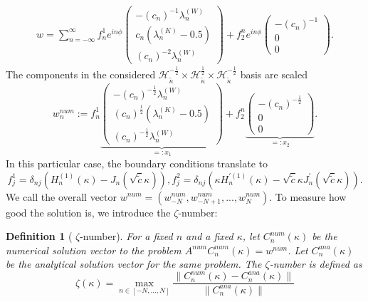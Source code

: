 \documentclass[12pt,journal,compsoc, onecolumn]{IEEEtran}
\newtheorem{definition}[theorem]{Definition}
\begin{document}
\begin{align}
w = \sum\limits_{n=-\infty}^\infty f^1_n e^{in\phi} 
\begin{pmatrix}
- (c_n)^{-1}\lambda_n^{(W)} \\
c_n(\lambda_n^{(K)} - 0.5)  \\
(c_n)^{-2}\lambda_n^{(W)} 
\end{pmatrix}
+ f_2^n e^{in\phi} 
\begin{pmatrix}
    -(c_n)^{-1} \\
    0 \\
    0
\end{pmatrix}.
\end{align}
The components in the considered $\mathcal{H}_{\tilde \kappa}^{-\frac{1}{2}} \times \mathcal{H}_{\tilde \kappa}^{\frac{1}{2}} \times \mathcal{H}_{\tilde \kappa}^{-\frac{1}{2}}$ basis are scaled  
$$
w^{num}_n
:=  f^1_n 
\underbrace{
\begin{pmatrix}
- (c_n)^{-\frac{1}{2}} \lambda_n^{(W)} \\
(c_n)^{\frac{1}{2}} (\lambda_n^{(K)} - 0.5)  \\
(c_n)^{-\frac{1}{2}} \lambda_n^{(W)} 
\end{pmatrix}}_{{=:x_1}}
+ f_2^n 
\underbrace{\begin{pmatrix}
    -(c_n)^{-\frac{1}{2}}  \\
    0 \\
    0
\end{pmatrix}}_{{=:x_2}}.
$$
In this particular case, the boundary conditions translate to $$f^1_j =  \delta_{nj} \left(H_n^{(1)}(\kappa) -  J_n(\sqrt{\tilde c} \kappa)  \right),
f^2_j = \delta_{nj} \left(\kappa H_n^{\prime(1)}(\kappa)
- \sqrt{\tilde c} \kappa J_n^{\prime}(\sqrt{\tilde c}\kappa) \right).$$
We call the overall vector $w^{num} = (w^{num}_{-N}, w^{num}_{-N + 1}, ..., w^{num}_{N})$.
To measure how good the solution is, we introduce the $\zeta$-number: 
\begin{definition}[ $\zeta$-number]
    For a fixed $n$ and a fixed $\kappa$, let ${C}^{num}_n(\kappa)$ be the numerical solution vector to the problem 
    $A^{num} {C}^{num}_n(\kappa) = w^{num}$. 
    Let ${C}^{ana}_n(\kappa)$ be the analytical solution vector for the same problem.
    The $\zeta$-number is defined as 
    $$
        \zeta(\kappa)=  \max\limits_{n \in [-N, ..., N]}\frac{\|{C}^{num}_n(\kappa) - {C}^{ana}_n(\kappa)\|}{\|{C}^{ana}_n(\kappa)\|}
    $$ 
\end{definition}  \noindent
\end{document}
